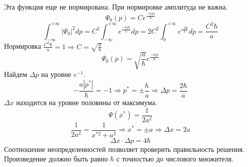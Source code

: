 Эта функция еще не нормирована. При нормировке амплитуда не важна.
 $$\Psi_0(p)=C e^{\frac{-a|p|}{\hbar}}$$
 $$\int_{-\infty}^{+\infty} |\Psi_0|^2 dp=C^2 \int_{-\infty}^{+\infty}e^{\frac{-a|p|}{\hbar}} dp= 2C^2 \int_{0}^{+\infty}e^{\frac{-ap}{\hbar}}dp=\frac{C^2\hbar}{a}$$
 Нормировка $\frac{C^2\hbar}{a}=1 \Longrightarrow C=\sqrt{\frac{a}{\hbar}}$ 
 $$\Psi_0(p)=\sqrt{\frac{a}{\hbar}} e^{\frac{-a|p|}{\hbar}}$$
 Найдем $\Delta p$ на уровне $e^{-1}$.
 $$-\frac{a|p^*|}{\hbar}=-1 \Longrightarrow p^*=\pm \frac{\hbar}{a} \Longrightarrow \Delta p=\frac{2\hbar}{a}$$
$\Delta x$ находится на уровне половины от максимума.
$$\Psi(x^*)=\frac{1}{2a^2}$$
$$\frac{1}{2a^2}=\frac{1}{x^{*2}+a^2} \Longrightarrow x^*=\pm a \Longrightarrow \Delta x=2a$$
$$\Delta x \cdot \Delta p= 4\hbar$$
 Соотношение неопределенностей позволяет проверить правильность решения. Произведение должно быть равно $\hbar$ с точностью до числового множителя.

